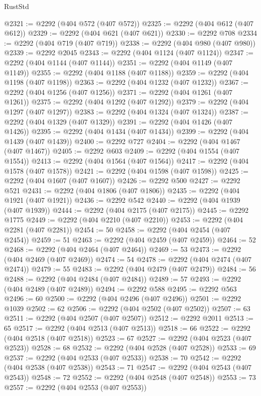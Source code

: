 \begin{lexlean}{RustStd}
\begin{coremodule}
@2321 := @2292 (@404 @572 (@407 @572))
@2325 := @2292 (@404 @612 (@407 @612))
@2329 := @2292 (@404 @621 (@407 @621))
@2330 := @2292 @708
@2334 := @2292 (@404 @719 (@407 @719))
@2338 := @2292 (@404 @980 (@407 @980))
@2339 := @2292 @2045
@2343 := @2292 (@404 @1124 (@407 @1124))
@2347 := @2292 (@404 @1144 (@407 @1144))
@2351 := @2292 (@404 @1149 (@407 @1149))
@2355 := @2292 (@404 @1188 (@407 @1188))
@2359 := @2292 (@404 @1198 (@407 @1198))
@2363 := @2292 (@404 @1232 (@407 @1232))
@2367 := @2292 (@404 @1256 (@407 @1256))
@2371 := @2292 (@404 @1261 (@407 @1261))
@2375 := @2292 (@404 @1292 (@407 @1292))
@2379 := @2292 (@404 @1297 (@407 @1297))
@2383 := @2292 (@404 @1324 (@407 @1324))
@2387 := @2292 (@404 @1329 (@407 @1329))
@2391 := @2292 (@404 @1426 (@407 @1426))
@2395 := @2292 (@404 @1434 (@407 @1434))
@2399 := @2292 (@404 @1439 (@407 @1439))
@2400 := @2292 @727
@2404 := @2292 (@404 @1467 (@407 @1467))
@2405 := @2292 @603
@2409 := @2292 (@404 @1554 (@407 @1554))
@2413 := @2292 (@404 @1564 (@407 @1564))
@2417 := @2292 (@404 @1578 (@407 @1578))
@2421 := @2292 (@404 @1598 (@407 @1598))
@2425 := @2292 (@404 @1607 (@407 @1607))
@2426 := @2292 @500
@2427 := @2292 @521
@2431 := @2292 (@404 @1806 (@407 @1806))
@2435 := @2292 (@404 @1921 (@407 @1921))
@2436 := @2292 @542
@2440 := @2292 (@404 @1939 (@407 @1939))
@2444 := @2292 (@404 @2175 (@407 @2175))
@2445 := @2292 @1775
@2449 := @2292 (@404 @2210 (@407 @2210))
@2453 := @2292 (@404 @2281 (@407 @2281))
@2454 := 50
@2458 := @2292 (@404 @2454 (@407 @2454))
@2459 := 51
@2463 := @2292 (@404 @2459 (@407 @2459))
@2464 := 52
@2468 := @2292 (@404 @2464 (@407 @2464))
@2469 := 53
@2473 := @2292 (@404 @2469 (@407 @2469))
@2474 := 54
@2478 := @2292 (@404 @2474 (@407 @2474))
@2479 := 55
@2483 := @2292 (@404 @2479 (@407 @2479))
@2484 := 56
@2488 := @2292 (@404 @2484 (@407 @2484))
@2489 := 57
@2493 := @2292 (@404 @2489 (@407 @2489))
@2494 := @2292 @588
@2495 := @2292 @563
@2496 := 60
@2500 := @2292 (@404 @2496 (@407 @2496))
@2501 := @2292 @1039
@2502 := 62
@2506 := @2292 (@404 @2502 (@407 @2502))
@2507 := 63
@2511 := @2292 (@404 @2507 (@407 @2507))
@2512 := @2292 @2011
@2513 := 65
@2517 := @2292 (@404 @2513 (@407 @2513))
@2518 := 66
@2522 := @2292 (@404 @2518 (@407 @2518))
@2523 := 67
@2527 := @2292 (@404 @2523 (@407 @2523))
@2528 := 68
@2532 := @2292 (@404 @2528 (@407 @2528))
@2533 := 69
@2537 := @2292 (@404 @2533 (@407 @2533))
@2538 := 70
@2542 := @2292 (@404 @2538 (@407 @2538))
@2543 := 71
@2547 := @2292 (@404 @2543 (@407 @2543))
@2548 := 72
@2552 := @2292 (@404 @2548 (@407 @2548))
@2553 := 73
@2557 := @2292 (@404 @2553 (@407 @2553))

\end{coremodule}
\end{lexlean}
